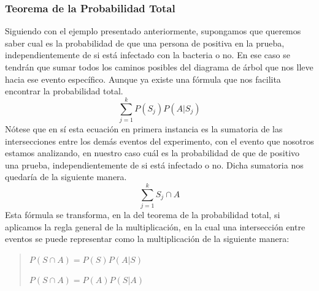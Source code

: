 \documentclass[]{article}
\begin{document}
\subsubsection*{Teorema de la Probabilidad Total}
Siguiendo con el ejemplo presentado anteriormente, supongamos que queremos saber cual es la probabilidad de que una persona de positiva en la prueba, independientemente de si está infectado con la bacteria o no.
En ese caso se tendrán que sumar todos los caminos posibles del diagrama de árbol que nos lleve hacia ese evento específico. Aunque ya existe una fórmula que nos facilita encontrar la probabilidad total.
\[ \sum_{j=1}^{k} P(S_j)P(A|S_j) \]
Nótese que en sí esta ecuación en primera instancia es la sumatoria de las intersecciones entre los demás eventos del experimento, con el evento que nosotros estamos analizando, en nuestro caso cuál es la probabilidad de que de positivo una prueba, independientemente de si está infectado o no. Dicha sumatoria nos quedaría de la siguiente manera.
\[ \sum_{j=1}^{k} S_j \cap A \]
Esta fórmula se transforma, en la del teorema de la probabilidad total, si aplicamos la regla general de la multiplicación, en la cual una intersección entre eventos se puede representar como la multiplicación de la siguiente manera:
\begin{quote}
	\item $P(S \cap A) = P(S)P(A|S)$
	\item $P(S \cap A) = P(A)P(S|A)$
\end{quote}
\end{document}
